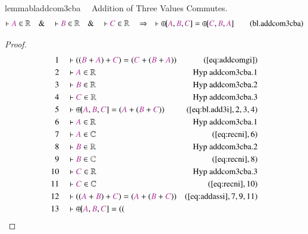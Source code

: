 \begin{restatable}{lemma}{bladdcom3cba}~~ Addition of Three Values Commutes.
\begin{align}
\vdash \mc{A} \in \mathbb{R}\quad\&\quad \vdash \mc{B} \in
    \mathbb{R}\quad\&\quad \vdash \mc{C} \in \mathbb{R}\quad\Rightarrow\quad
    \vdash {\oplus\hspace{-1pt}[} \mc{A} , \mc{B} , \mc{C} ] =
    {\oplus\hspace{-1pt}[} \mc{C} , \mc{B} , \mc{A}
    ]\label{eq:bl.addcom3cba}\tag{bl.addcom3cba}
\end{align}
\end{restatable}

\begin{proof}
\begin{align}
  1 &&  & \vdash ( ( \mc{B} + \mc{A} ) + \mc{C} ) = ( \mc{C} + ( \mc{B} +
      \mc{A} ) )&(\mbox{\ref{eq:addcomgi}})\notag
  \\ 2 &&  & \vdash \mc{A} \in
\mathbb{R}&\text{Hyp~addcom3cba.1}\notag%
  \\ 3 &&  & \vdash \mc{B} \in
\mathbb{R}&\text{Hyp~addcom3cba.2}\notag%
  \\ 4 &&  & \vdash \mc{C} \in
\mathbb{R}&\text{Hyp~addcom3cba.3}\notag%
  \\ 5 &&  & \vdash {\oplus\hspace{-1pt}[} \mc{A} , \mc{B} , \mc{C} ] = (
      \mc{A} + ( \mc{B} + \mc{C} )
      )&(\mbox{\ref{eq:bl.add3i}},2,3,4)\notag
  \\ 6 &&  & \vdash \mc{A} \in
\mathbb{R}&\text{Hyp~addcom3cba.1}\notag%
  \\ 7 &&  & \vdash \mc{A} \in \mathbb{C}&(\mbox{\ref{eq:recni}},6)\notag
  \\ 8 &&  & \vdash \mc{B} \in
\mathbb{R}&\text{Hyp~addcom3cba.2}\notag%
  \\ 9 &&  & \vdash \mc{B} \in \mathbb{C}&(\mbox{\ref{eq:recni}},8)\notag
  \\ 10 &&  & \vdash \mc{C} \in
\mathbb{R}&\text{Hyp~addcom3cba.3}\notag%
  \\ 11 &&  & \vdash \mc{C} \in \mathbb{C}&(\mbox{\ref{eq:recni}},10)\notag
  \\ 12 &&  & \vdash ( ( \mc{A} + \mc{B} ) + \mc{C} ) = ( \mc{A} + ( \mc{B} +
      \mc{C} ) )&(\mbox{\ref{eq:addassi}},7,9,11)\notag
  \\ 13 &&  & \vdash {\oplus\hspace{-1pt}[} \mc{A} , \mc{B} , \mc{C} ] = ( (

\end{align}
\end{proof}
